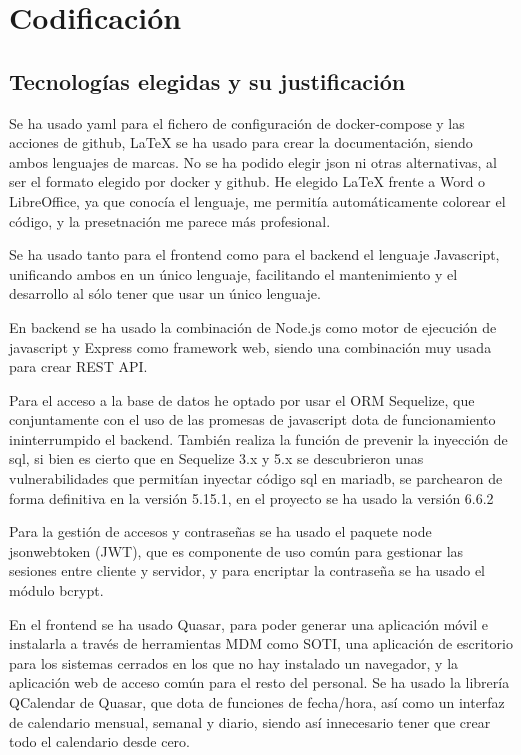 \documentclass[11pt,spanish,listoffigures,listoftables]{tfgetsinf}
\begin{document}
\chapter{Codificación}

\section{Tecnologías elegidas y su justificación}

Se ha usado yaml para el fichero de configuración de docker-compose y las acciones de github, \LaTeX{} se ha usado para crear la documentación, siendo ambos lenguajes de marcas. 
No se ha podido elegir json ni otras alternativas, al ser el formato elegido por docker y github. He elegido \LaTeX{} frente a Word o LibreOffice, ya que conocía el lenguaje, me permitía automáticamente colorear el código, y la presetnación me parece más profesional.

Se ha usado tanto para el frontend como para el backend el lenguaje Javascript, unificando ambos en un único lenguaje, facilitando el mantenimiento y el desarrollo al sólo tener que usar un único lenguaje.

En backend se ha usado la combinación de Node.js como motor de ejecución de javascript y Express como framework web, siendo una combinación muy usada para crear REST API.

Para el acceso a la base de datos he optado por usar el ORM Sequelize, que conjuntamente con el uso de las promesas de javascript dota de funcionamiento ininterrumpido el backend. 
También realiza la función de prevenir la inyección de sql, si bien es cierto que en Sequelize 3.x y 5.x se descubrieron unas vulnerabilidades que permitían inyectar código sql en mariadb, se parchearon de forma definitiva en la versión 5.15.1, en el proyecto se ha usado la versión 6.6.2

Para la gestión de accesos y contraseñas se ha usado el paquete node jsonwebtoken (JWT), que es componente de uso común para gestionar las sesiones entre cliente y servidor, y para encriptar la contraseña se ha usado el módulo bcrypt.

En el frontend se ha usado Quasar, para poder generar una aplicación móvil e instalarla a través de herramientas MDM como SOTI, una aplicación de escritorio para los sistemas cerrados en los que no hay instalado un navegador, y la aplicación web de acceso común para el resto del personal.
Se ha usado la librería QCalendar de Quasar, que dota de funciones de fecha/hora, así como un interfaz de calendario mensual, semanal y diario, siendo así innecesario tener que crear todo el calendario desde cero.
\end{document}
